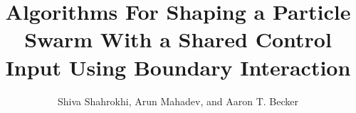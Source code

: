 \documentclass[conference]{IEEEtran}
\begin{document}
\title{Algorithms For Shaping a Particle Swarm With a Shared Control Input Using Boundary Interaction}

\author{Shiva Shahrokhi, Arun Mahadev, and Aaron T. Becker}





% 

\newpage

\maketitle
\end{document}
